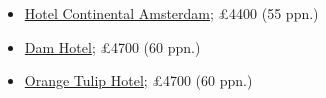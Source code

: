 \documentclass[12pt]{article}
\newcommand{\cost}[2]{\pounds#1 (#2 ppn.)}
\begin{document}
\begin{itemize}
		\item
		\href{https://www.booking.com/hotel/nl/continentcentre.html?aid=355028;sid=3f62ec944d118827daff72c411262409;all_sr_blocks=1092707_95129685_0_0_0%2C1092707_95129685_0_0_0%2C1092702_95129685_0_0_0;checkin=2022-05-28;checkout=2022-06-05;dest_id=145;dest_type=district;dist=0;group_adults=10;group_children=0;hapos=19;highlighted_blocks=1092707_95129685_0_0_0%2C1092707_95129685_0_0_0%2C1092702_95129685_0_0_0;hpos=19;matching_block_id=1092707_95129685_0_0_0;no_rooms=1;req_adults=10;req_children=0;room1=A%2CA%2CA%2CA%2CA%2CA%2CA%2CA%2CA%2CA;sb_price_type=total;sr_order=popularity;sr_pri_blocks=1092707_95129685_0_0_0__203458%2C1092707_95129685_0_0_0__203458%2C1092702_95129685_0_0_0__118778;srepoch=1648313785;srpvid=5a3f77194b1f019a;type=total;ucfs=1&#hotelTmpl}{Hotel Continental Amsterdam}; \cost{4400}{55}
		\item 
		\href{https://www.booking.com/hotel/nl/dam.html?aid=355028;sid=3f62ec944d118827daff72c411262409;all_sr_blocks=32588308_93731939_0_0_0%2C32588314_93731939_0_0_0%2C32588313_93731939_0_0_0;checkin=2022-05-28;checkout=2022-06-05;dest_id=145;dest_type=district;dist=0;group_adults=10;group_children=0;hapos=18;highlighted_blocks=32588308_93731939_0_0_0%2C32588314_93731939_0_0_0%2C32588313_93731939_0_0_0;hpos=18;matching_block_id=32588308_93731939_0_0_0;no_rooms=1;req_adults=10;req_children=0;room1=A%2CA%2CA%2CA%2CA%2CA%2CA%2CA%2CA%2CA;sb_price_type=total;sr_order=popularity;sr_pri_blocks=32588308_93731939_0_0_0__224147%2C32588314_93731939_0_0_0__224147%2C32588313_93731939_0_0_0__122609;srepoch=1648313785;srpvid=5a3f77194b1f019a;type=total;ucfs=1&#hotelTmpl}{Dam Hotel}; \cost{4700}{60}
		\item 
		\href{https://www.booking.com/hotel/nl/oranjetulp.html?aid=355028;sid=3f62ec944d118827daff72c411262409;all_sr_blocks=1043115_101891380_0_0_0%2C1043112_101891380_0_0_0%2C1043117_101891380_0_0_0;checkin=2022-05-28;checkout=2022-06-05;dest_id=145;dest_type=district;dist=0;group_adults=10;group_children=0;hapos=21;highlighted_blocks=1043115_101891380_0_0_0%2C1043112_101891380_0_0_0%2C1043117_101891380_0_0_0;hpos=21;matching_block_id=1043115_101891380_0_0_0;no_rooms=1;req_adults=10;req_children=0;room1=A%2CA%2CA%2CA%2CA%2CA%2CA%2CA%2CA%2CA;sb_price_type=total;sr_order=popularity;sr_pri_blocks=1043115_101891380_0_0_0__224147%2C1043112_101891380_0_0_0__224147%2C1043117_101891380_0_0_0__122609;srepoch=1648313785;srpvid=5a3f77194b1f019a;type=total;ucfs=1&#hotelTmpl}{Orange Tulip Hotel}; \cost{4700}{60}
	\end{itemize}
\end{document}
